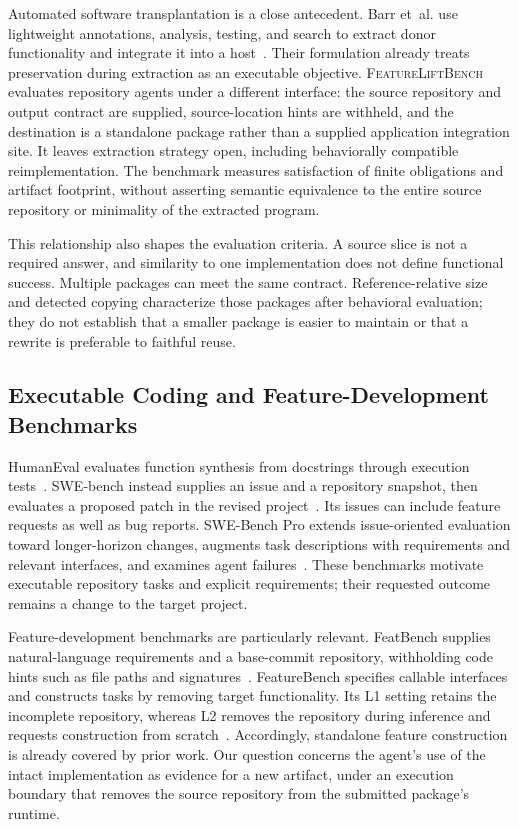 \documentclass[acmsmall,screen,review,anonymous,nonacm]{acmart}
\newcommand{\flb}{\textsc{FeatureLiftBench}\xspace}
\begin{document}
Automated software transplantation is a close antecedent. Barr et~al. use
lightweight annotations, analysis, testing, and search to extract donor
functionality and integrate it into a host~\cite{barr2015transplantation}.
Their formulation already treats preservation during extraction as an
executable objective. \flb evaluates repository agents under a different
interface: the source repository and output contract are supplied, source-location hints
are withheld, and the destination is a standalone package rather than a supplied
application integration site. It leaves extraction strategy open, including
behaviorally compatible reimplementation. The benchmark measures satisfaction
of finite obligations and artifact footprint, without asserting semantic
equivalence to the entire source repository or minimality of the extracted program.

This relationship also shapes the evaluation criteria. A source slice is not a
required answer, and similarity to one implementation does not define functional
success. Multiple packages can meet the same contract. Reference-relative size
and detected copying characterize those packages after behavioral evaluation;
they do not establish that a smaller package is easier to maintain or that a
rewrite is preferable to faithful reuse.

\subsection{Executable Coding and Feature-Development Benchmarks}

HumanEval evaluates function synthesis from docstrings through execution
tests~\cite{chen2021codex}. SWE-bench instead supplies an issue and a repository
snapshot, then evaluates a proposed patch in the revised
project~\cite{jimenez2024swebench}. Its issues can include feature requests as well
as bug reports. SWE-Bench Pro extends issue-oriented evaluation toward
longer-horizon changes, augments task descriptions with requirements and relevant
interfaces, and examines agent failures~\cite{deng2025swebenchpro}.
These benchmarks motivate executable repository tasks and explicit requirements;
their requested outcome remains a change to the target project.

Feature-development benchmarks are particularly relevant. FeatBench supplies
natural-language requirements and a base-commit repository, withholding code
hints such as file paths and signatures~\cite{chen2026featbench}. FeatureBench
specifies callable interfaces and constructs tasks by removing target
functionality. Its L1 setting retains the incomplete repository, whereas L2
removes the repository during inference and requests construction from
scratch~\cite{zhou2026featurebench}. Accordingly, standalone feature construction
is already covered by prior work. Our question concerns the agent's use of the
intact implementation as evidence for a new artifact, under an execution
boundary that removes the source repository from the submitted package's runtime.
\end{document}

